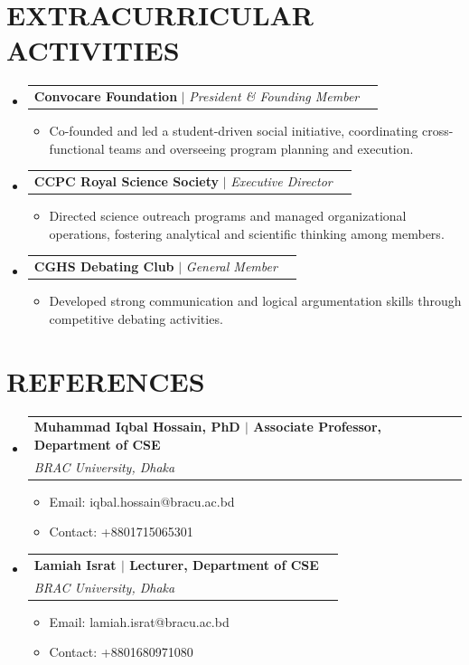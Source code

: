 \documentclass[a4paper,11pt]{article}
\makeatletter
\newcommand{\resumeItem}[1]{\item\small{{#1 \vspace{-2pt}}}}
\newcommand{\resumeSubheading}[4]{
  \vspace{-2pt}\item
    \begin{tabular*}{1.0\textwidth}[t]{l@{\extracolsep{\fill}}r}
      \textbf{#1} & \textbf{\small #2} \\
      \textit{\small#3} & \textit{\small #4} \\
    \end{tabular*}\vspace{-6pt}
}
\newcommand{\resumeProjectHeading}[2]{
    \item
    \begin{tabular*}{1.001\textwidth}{l@{\extracolsep{\fill}}r}
      \small#1 & \textbf{\small #2}\\
    \end{tabular*}\vspace{-6pt}
}
\newcommand{\resumeItemListStart}{\begin{itemize}}
\newcommand{\resumeItemListEnd}{\end{itemize}\vspace{-5pt}}
\newcommand{\resumeSubHeadingListStart}{\begin{itemize}[leftmargin=0.0in, label={}]}
\newcommand{\resumeSubHeadingListEnd}{\end{itemize}}
\makeatother
\begin{document}
\section{EXTRACURRICULAR ACTIVITIES}
\vspace{-7pt}
\resumeSubHeadingListStart
  \resumeProjectHeading
      {\textbf{Convocare Foundation} $|$ \emph{President \& Founding Member}}{}
      \resumeItemListStart
        \resumeItem{Co-founded and led a student-driven social initiative, coordinating cross-functional teams and overseeing program planning and execution.}
      \resumeItemListEnd
    \vspace{-10pt}
  \resumeProjectHeading
      {\textbf{CCPC Royal Science Society} $|$ \emph{Executive Director}}{}
      \resumeItemListStart
        \resumeItem{Directed science outreach programs and managed organizational operations, fostering analytical and scientific thinking among members.}
      \resumeItemListEnd
    \vspace{-10pt}
  \resumeProjectHeading
      {\textbf{CGHS Debating Club} $|$ \emph{General Member}}{}
      \resumeItemListStart
        \resumeItem{Developed strong communication and logical argumentation skills through competitive debating activities.}
      \resumeItemListEnd
\resumeSubHeadingListEnd
\vspace{-6pt}

\section{REFERENCES}
\resumeSubHeadingListStart
  \resumeSubheading
    {Muhammad Iqbal Hossain, PhD $|$ Associate Professor, Department of CSE}{}
    {BRAC University, Dhaka}{}
    \vspace{-8pt}
    \begin{itemize}[leftmargin=0in, label={}]
        \item \small Email: iqbal.hossain@bracu.ac.bd\vspace{-4pt}
        \item \small Contact: +8801715065301
    \end{itemize}
  \resumeSubheading
    {Lamiah Israt $|$ Lecturer, Department of CSE}{}
    {BRAC University, Dhaka}{}
    \vspace{-8pt}
    \begin{itemize}[leftmargin=0in, label={}]
        \item \small Email: lamiah.israt@bracu.ac.bd\vspace{-4pt}
        \item \small Contact: +8801680971080
    \end{itemize}
\resumeSubHeadingListEnd
\end{document}
